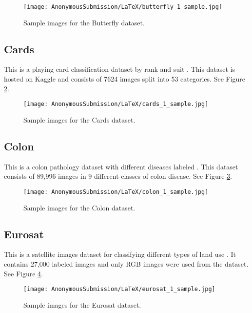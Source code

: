 \documentclass[letterpaper]{article} %
\theoremstyle{plain}
\theoremstyle{definition}
\theoremstyle{remark}
\begin{document}
\begin{figure}[htbp]
    \centering
    \texttt{[image: AnonymousSubmission/LaTeX/butterfly\_1\_sample.jpg]}
    \caption{Sample images for the Butterfly dataset.}
    \label{fig:butterfly}
\end{figure}

\subsection{Cards} This is a playing card classification dataset by rank and suit \citep{card_data}. This dataset is hosted on Kaggle and consists of 7624 images split into 53 categories. See Figure \ref{fig:cards}.

\begin{figure}[htbp]
    \centering
    \texttt{[image: AnonymousSubmission/LaTeX/cards\_1\_sample.jpg]}
    \caption{Sample images for the Cards dataset.}
    \label{fig:cards}
\end{figure}


\subsection{Colon} This is a colon pathology dataset with different diseases labeled \citep{yang2023medmnist}. This dataset consists of 89,996 images in 9 different classes of colon disease. See Figure \ref{fig:colon}.


\begin{figure}[htbp]
    \centering
    \texttt{[image: AnonymousSubmission/LaTeX/colon\_1\_sample.jpg]}
    \caption{Sample images for the Colon dataset.}
    \label{fig:colon}
\end{figure}

\subsection{Eurosat} This is a satellite images dataset for classifying different types of land use \citep{helber2019eurosat}. It contains 27,000 labeled images and only RGB images were used from the dataset. See Figure \ref{fig:eurosat}.

\begin{figure}[htbp]
    \centering
    \texttt{[image: AnonymousSubmission/LaTeX/eurosat\_1\_sample.jpg]}
    \caption{Sample images for the Eurosat dataset.}
    \label{fig:eurosat}
\end{figure}
\end{document}
